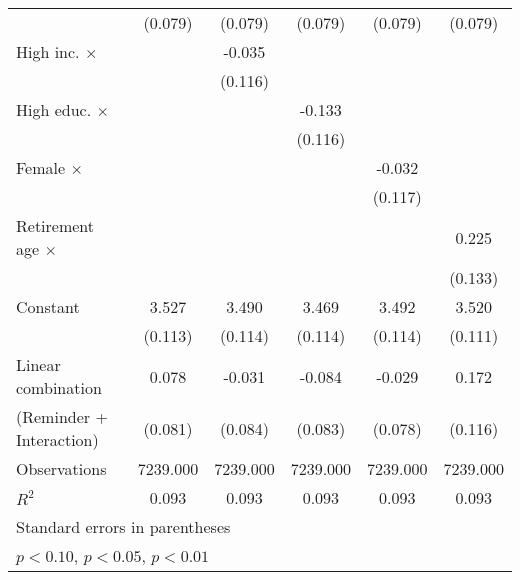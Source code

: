 {\begin{tabular}{l*{5}{c}}
                    &     (0.079)         &     (0.079)         &     (0.079)         &     (0.079)         &     (0.079)         \\
\addlinespace
High inc. $\times$  &                     &      -0.035         &                     &                     &                     \\
                    &                     &     (0.116)         &                     &                     &                     \\
\addlinespace
High educ. $\times$ &                     &                     &      -0.133         &                     &                     \\
                    &                     &                     &     (0.116)         &                     &                     \\
\addlinespace
Female $\times$     &                     &                     &                     &      -0.032         &                     \\
                    &                     &                     &                     &     (0.117)         &                     \\
\addlinespace
Retirement age $\times$&                     &                     &                     &                     &       0.225\sym{*}  \\
                    &                     &                     &                     &                     &     (0.133)         \\
\addlinespace
Constant            &       3.527\sym{***}&       3.490\sym{***}&       3.469\sym{***}&       3.492\sym{***}&       3.520\sym{***}\\
                    &     (0.113)         &     (0.114)         &     (0.114)         &     (0.114)         &     (0.111)         \\
\midrule
Linear combination  &       0.078         &      -0.031         &      -0.084         &      -0.029         &       0.172         \\
(Reminder + Interaction)&     (0.081)         &     (0.084)         &     (0.083)         &     (0.078)         &     (0.116)         \\
Observations        &    7239.000         &    7239.000         &    7239.000         &    7239.000         &    7239.000         \\
\(R^{2}\)           &       0.093         &       0.093         &       0.093         &       0.093         &       0.093         \\
\bottomrule
\multicolumn{6}{l}{\footnotesize Standard errors in parentheses}\\
\multicolumn{6}{l}{\footnotesize \sym{*} \(p<0.10\), \sym{**} \(p<0.05\), \sym{***} \(p<0.01\)}\\
\end{tabular}
}
